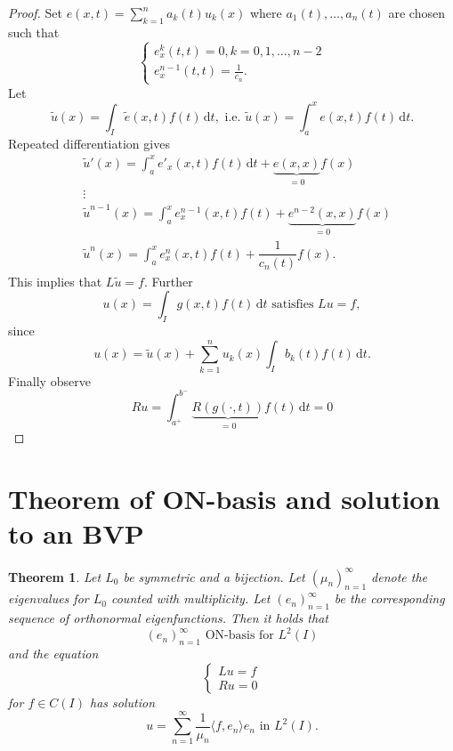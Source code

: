 \documentclass[12pt, a4paper]{article}
\newcommand{\rd}{\ensuremath{\mathrm{d}}}
\newcommand{\id}{\ensuremath{\,\rd}}
\newtheorem{theorem}{Theorem}[section]
\begin{document}
\begin{proof}
Set $e(x,t) = \sum_{k=1}^n a_k(t)u_k(x)$ where $a_1(t),\dots, a_n(t)$ are chosen such that
\begin{equation*}
\begin{cases}
     e_x^{k}(t,t) = 0, k=0,1,\dots, n-2 \\
    e_x^{n-1}(t,t) = \frac{1}{c_n}.
\end{cases}
\end{equation*}
Let
\begin{equation*}
\tilde{u}(x) = \int_I \tilde{e}(x,t)f(t)\id t, \text{ i.e. }\tilde{u}(x) = \int_a^x e(x,t)f(t)\id t.
\end{equation*}
Repeated differentiation gives
\begin{equation*}
\begin{split}
&\tilde{u}'(x) = \int_a^x e'_x(x,t)f(t)\id t + \underbrace{e(x,x)}_{=0}f(x) \\
&\vdots \\
&\tilde{u}^{n-1}(x) = \int_a^x e^{n-1}_x(x,t)f(t) + \underbrace{e^{n-2}(x,x)}_{=0}f(x) \\
& \tilde{u}^n(x) = \int_a^x e^n_x(x,t)f(t) + \dfrac{1}{c_n(t)}f(x).
\end{split}
\end{equation*}
This implies that $L\tilde{u} = f$. Further
\begin{equation*}
u(x) = \int_I g(x,t)f(t)\id t \text{ satisfies } Lu = f,
\end{equation*}
since
\begin{equation*}
u(x) = \tilde{u}(x) + \sum_{k=1}^n u_k(x) \int_I b_k(t)f(t)\id t.
\end{equation*}
Finally observe
\begin{equation*}
Ru = \int_{a^+}^{b^-} \underbrace{R(g(\cdot, t))}_{=0} f(t)\id t = 0
\end{equation*}
\end{proof}

\section{Theorem of ON-basis and solution to an BVP}
\begin{theorem}
Let $L_0$ be symmetric and a bijection. Let $(\mu_n)_{n=1}^\infty$ denote the eigenvalues for $L_0$ counted with multiplicity. Let $(e_n)_{n=1}^\infty$ be the corresponding sequence of orthonormal eigenfunctions. Then it holds that
\begin{equation*}
(e_n)_{n=1}^\infty \text{ ON-basis for } L^2(I)
\end{equation*}
and the equation
\begin{equation*}
\begin{cases}
Lu = f \\
Ru = 0
\end{cases}
\end{equation*}
for $f\in C(I)$ has solution
\begin{equation*}
u = \sum_{n=1}^\infty \dfrac{1}{\mu_n} \langle f,e_n\rangle e_n \text{ in } L^2(I).
\end{equation*}
\end{theorem}
\end{document}
